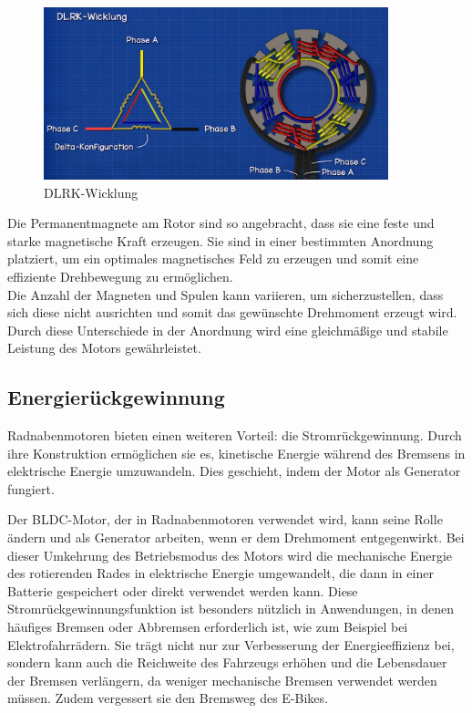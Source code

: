 \begin{figure}[h]
    \centering
    \includegraphics[width=10cm]{images/DLRK-Wicklung.png}
    \caption{DLRK-Wicklung\cite{ingenieursmentalitat_burstenloser_2022}}%
    \label{fig:12}
\end{figure}

Die Permanentmagnete am Rotor sind so angebracht, dass sie eine feste und starke magnetische Kraft erzeugen.
Sie sind in einer bestimmten Anordnung platziert, um ein optimales magnetisches Feld zu erzeugen und somit eine effiziente Drehbewegung zu ermöglichen.\\
Die Anzahl der Magneten und Spulen kann variieren, um sicherzustellen, dass sich diese nicht ausrichten und somit das gewünschte Drehmoment erzeugt wird.
Durch diese Unterschiede in der Anordnung wird eine gleichmäßige und stabile Leistung des Motors gewährleistet.\\







\subsection{Energierückgewinnung}\label{subsec:energieruckgewinnung}

Radnabenmotoren bieten einen weiteren Vorteil: die Stromrückgewinnung.
Durch ihre Konstruktion ermöglichen sie es, kinetische Energie während des Bremsens in elektrische Energie umzuwandeln.
Dies geschieht, indem der Motor als Generator fungiert.

Der BLDC-Motor, der in Radnabenmotoren verwendet wird, kann seine Rolle ändern und als Generator arbeiten, wenn er dem Drehmoment entgegenwirkt.
Bei dieser Umkehrung des Betriebsmodus des Motors wird die mechanische Energie des rotierenden Rades in elektrische Energie umgewandelt, die dann in einer Batterie gespeichert oder direkt verwendet werden kann.
Diese Stromrückgewinnungsfunktion ist besonders nützlich in Anwendungen, in denen häufiges Bremsen oder Abbremsen erforderlich ist, wie zum Beispiel bei Elektrofahrrädern.
Sie trägt nicht nur zur Verbesserung der Energieeffizienz bei, sondern kann auch die Reichweite des Fahrzeugs erhöhen und die Lebensdauer der Bremsen verlängern, da weniger mechanische Bremsen verwendet werden müssen.
Zudem vergessert sie den Bremsweg des E-Bikes.

